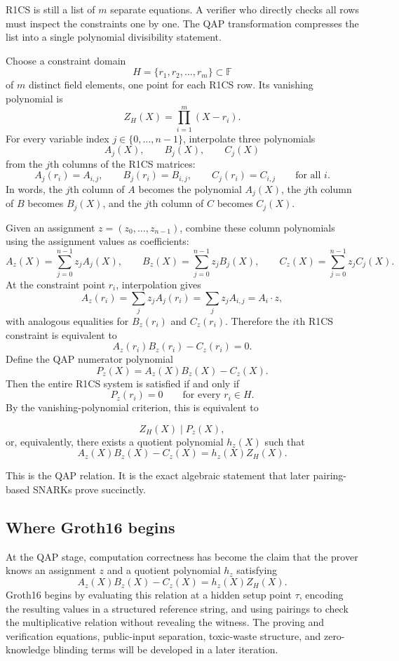 \documentclass[11pt]{article}
\newcommand{\F}{\mathbb{F}}
\begin{document}
R1CS is still a list of $m$ separate equations. A verifier who directly checks all rows must inspect the constraints one by one. The QAP transformation compresses the list into a single polynomial divisibility statement.

Choose a constraint domain
\[
    H=\{r_1,r_2,\ldots,r_m\}\subset\F
\]
of $m$ distinct field elements, one point for each R1CS row. Its vanishing polynomial is
\[
    Z_H(X)=\prod_{i=1}^{m}(X-r_i).
\]
For every variable index $j\in\{0,\ldots,n-1\}$, interpolate three polynomials
\[
    A_j(X),\qquad B_j(X),\qquad C_j(X)
\]
from the $j$th columns of the R1CS matrices:
\[
    A_j(r_i)=A_{i,j},
    \qquad
    B_j(r_i)=B_{i,j},
    \qquad
    C_j(r_i)=C_{i,j}
    \qquad
    \text{for all }i.
\]
In words, the $j$th column of $A$ becomes the polynomial $A_j(X)$, the $j$th column of $B$ becomes $B_j(X)$, and the $j$th column of $C$ becomes $C_j(X)$.

Given an assignment $z=(z_0,\ldots,z_{n-1})$, combine these column polynomials using the assignment values as coefficients:
\[
    A_z(X)=\sum_{j=0}^{n-1}z_jA_j(X),
    \qquad
    B_z(X)=\sum_{j=0}^{n-1}z_jB_j(X),
    \qquad
    C_z(X)=\sum_{j=0}^{n-1}z_jC_j(X).
\]
At the constraint point $r_i$, interpolation gives
\[
    A_z(r_i)=\sum_j z_jA_j(r_i)=\sum_j z_jA_{i,j}=A_i\cdot z,
\]
with analogous equalities for $B_z(r_i)$ and $C_z(r_i)$. Therefore the $i$th R1CS constraint is equivalent to
\[
    A_z(r_i)B_z(r_i)-C_z(r_i)=0.
\]
Define the QAP numerator polynomial
\[
    P_z(X)=A_z(X)B_z(X)-C_z(X).
\]
Then the entire R1CS system is satisfied if and only if
\[
    P_z(r_i)=0\qquad\text{for every }r_i\in H.
\]
By the vanishing-polynomial criterion, this is equivalent to
\begin{tcolorbox}
\[
    Z_H(X)\mid P_z(X),
\]
or, equivalently, there exists a quotient polynomial $h_z(X)$ such that
\[
    A_z(X)B_z(X)-C_z(X)=h_z(X)Z_H(X).
\]
\end{tcolorbox}
This is the QAP relation. It is the exact algebraic statement that later pairing-based SNARKs prove succinctly.

\subsection{Where Groth16 begins}

At the QAP stage, computation correctness has become the claim that the prover knows an assignment $z$ and a quotient polynomial $h_z$ satisfying
\[
    A_z(X)B_z(X)-C_z(X)=h_z(X)Z_H(X).
\]
Groth16 begins by evaluating this relation at a hidden setup point $\tau$, encoding the resulting values in a structured reference string, and using pairings to check the multiplicative relation without revealing the witness. The proving and verification equations, public-input separation, toxic-waste structure, and zero-knowledge blinding terms will be developed in a later iteration.
\end{document}
